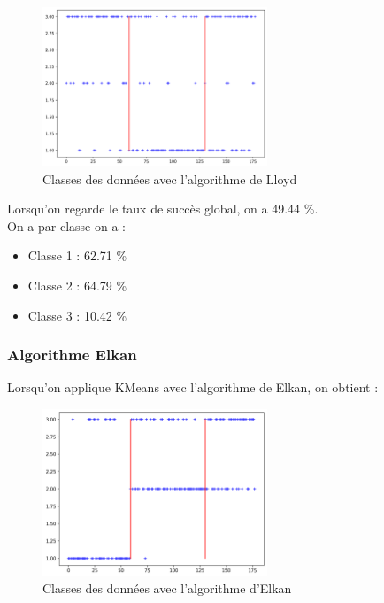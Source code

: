 \documentclass[a4paper,12pt]{article}
\begin{document}
\newpage

\begin{figure}[h!] %
   \centering
   \includegraphics[width=0.6\textwidth]{lloyd.png} %
   \caption{Classes des données avec l'algorithme de Lloyd}
   \label{fig:lloyd} %
\end{figure}

Lorsqu'on regarde le taux de succès global, on a 49.44 \%.\\

On a par classe on a :
\begin{itemize}
\item Classe 1 : 62.71 \%
\item Classe 2 : 64.79 \%
\item Classe 3 : 10.42 \%
\end{itemize}


\subsubsection{Algorithme Elkan}
Lorsqu'on applique KMeans avec l'algorithme de Elkan, on obtient :



\begin{figure}[h!] %
   \centering
   \includegraphics[width=0.6\textwidth]{elkan.png} %
   \caption{Classes des données avec l'algorithme d'Elkan}
   \label{fig:elkan} %
\end{figure}
\end{document}
